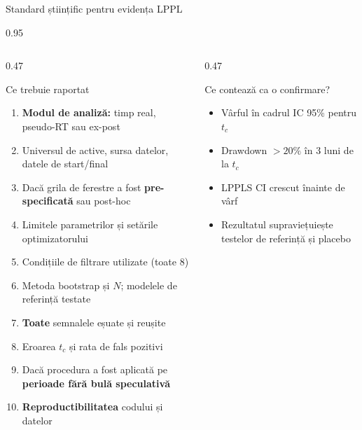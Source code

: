 \documentclass[9pt, aspectratio=169, t]{beamer}
\begin{document}
\begin{frame}{Standard științific pentru evidența LPPL}
    \begin{cminipage}{0.95\textwidth}
    {\scriptsize
    \begin{columns}[T]
        \begin{column}{0.47\textwidth}
            \begin{alertblock}{Ce trebuie raportat}
                \begin{enumerate}\setlength{\itemsep}{0pt}
                    \item \textbf{Modul de analiză:} timp real, pseudo-RT sau ex-post
                    \item Universul de active, sursa datelor, datele de start/final
                    \item Dacă grila de ferestre a fost \textbf{pre-specificată} sau post-hoc
                    \item Limitele parametrilor și setările optimizatorului
                    \item Condițiile de filtrare utilizate (toate 8)
                    \item Metoda bootstrap și $N$; modelele de referință testate
                    \item \textbf{Toate} semnalele eșuate și reușite
                    \item Eroarea $t_c$ și rata de fals pozitivi
                    \item Dacă procedura a fost aplicată pe \textbf{perioade fără bulă speculativă}
                    \item \textbf{Reproductibilitatea} codului și datelor
                \end{enumerate}
            \end{alertblock}
        \end{column}
        \begin{column}{0.47\textwidth}
            \begin{block}{Ce contează ca o confirmare?}
                \begin{itemize}\setlength{\itemsep}{0pt}
                    \item Vârful în cadrul IC 95\% pentru $t_c$
                    \item Drawdown $> 20\%$ în 3 luni de la $t_c$
                    \item LPPLS CI crescut înainte de vârf
                    \item Rezultatul supraviețuiește testelor de referință și placebo

\end{itemize}
\end{block}
\end{column}
\end{columns}}
\end{cminipage}
\end{frame}
\end{document}
